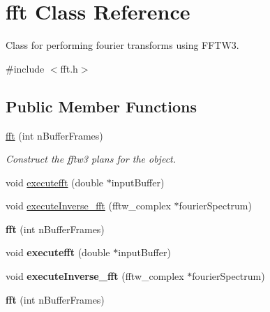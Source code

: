 \hypertarget{classfft}{\section{fft Class Reference}
\label{classfft}
}


Class for performing fourier transforms using F\-F\-T\-W3.  




{\ttfamily \#include $<$fft.\-h$>$}

\subsection*{Public Member Functions}
\begin{DoxyCompactItemize}
\item 
\hypertarget{classfft_a5fff94ac07119207ddd05f628be5891d}{\hyperlink{classfft_a5fff94ac07119207ddd05f628be5891d}{fft} (int n\-Buffer\-Frames)}\label{classfft_a5fff94ac07119207ddd05f628be5891d}

\begin{DoxyCompactList}\small\item\em Construct the fftw3 plans for the object. \end{DoxyCompactList}\item 
void \hyperlink{classfft_a47e58fd4f715ad89a6fad8df9d715bf4}{executefft} (double $\ast$input\-Buffer)
\item 
void \hyperlink{classfft_a228bd861564c189cd7b6800c950a1c09}{execute\-Inverse\-\_\-fft} (fftw\-\_\-complex $\ast$fourier\-Spectrum)
\item 
\hypertarget{classfft_a5fff94ac07119207ddd05f628be5891d}{{\bfseries fft} (int n\-Buffer\-Frames)}\label{classfft_a5fff94ac07119207ddd05f628be5891d}

\item 
\hypertarget{classfft_a47e58fd4f715ad89a6fad8df9d715bf4}{void {\bfseries executefft} (double $\ast$input\-Buffer)}\label{classfft_a47e58fd4f715ad89a6fad8df9d715bf4}

\item 
\hypertarget{classfft_a228bd861564c189cd7b6800c950a1c09}{void {\bfseries execute\-Inverse\-\_\-fft} (fftw\-\_\-complex $\ast$fourier\-Spectrum)}\label{classfft_a228bd861564c189cd7b6800c950a1c09}

\item 
\hypertarget{classfft_a5fff94ac07119207ddd05f628be5891d}{{\bfseries fft} (int n\-Buffer\-Frames)}\label{classfft_a5fff94ac07119207ddd05f628be5891d}


\end{DoxyCompactItemize}
